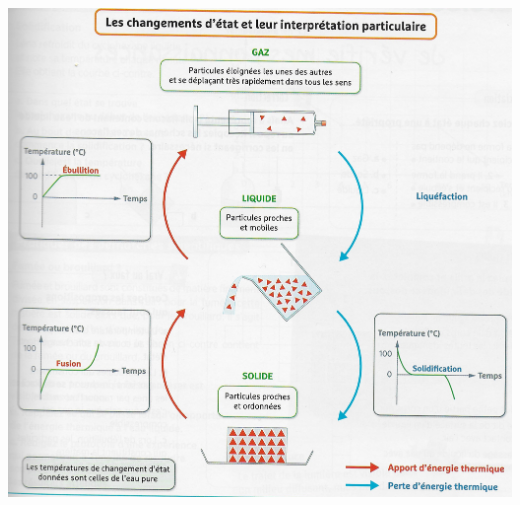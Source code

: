 \documentclass[xcolor={dvipsnames}]{beamer}
\begin{document}
\begin{frame}
	\begin{center}
		\includegraphics[scale=0.5]{chgmt_etats}
	\end{center}

\end{frame}%
%
%	
%
%
%	
\end{document}
